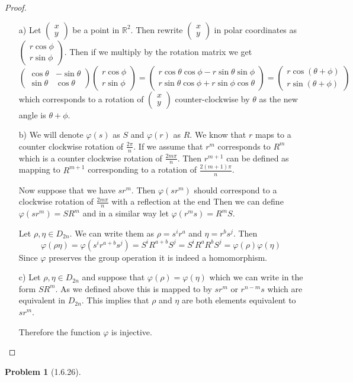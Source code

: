 \documentclass[10pt]{article}
\newcommand{\sk}{\vskip 10mm}
\newcommand{\bb}[1]{\mathbb{#1}}
\newcommand{\vc}[2]{\left(\begin{array}{cc} #1\\ #2\end{array}\right)}
\theoremstyle{plain}
\newtheorem{problem}{Problem}
\theoremstyle{remark}
\begin{document}
\begin{proof}
  \begin{itemize}
  \item[a)] Let $\vc{x}{y}$ be a point in $\bb{R}^2$. Then rewrite $\vc{x}{y}$ in
    polar coordinates as $\vc{r\cos\phi}{r\sin\phi}$. Then if we multiply by the
    rotation matrix we get
    \[
      \left(\begin{array}{cc}
        \cos\theta&-\sin\theta\\
        \sin\theta&\cos\theta
      \end{array}\right)
      \vc{r\cos\phi}{r\sin\phi}
      = \vc{r\cos\theta\cos\phi-r\sin\theta\sin\phi}{r\sin\theta\cos\phi+r\sin\phi\cos\theta}
      = \vc{r\cos(\theta+\phi)}{r\sin(\theta+\phi)}
    \]
    which corresponds to a rotation of $\vc{x}{y}$ counter-clockwise by $\theta$
    as the new angle is $\theta+\phi$.
  \item[b)] We will denote $\varphi(s)$ as $S$ and $\varphi(r)$ as $R$. We know that $r$
    maps to a counter clockwise rotation of $\frac{2\pi}{n}$. If we assume that $r^m$ corresponds
    to $R^m$ which is a counter clockwise rotation of $\frac{2m\pi}{n}$. Then $r^{m+1}$ can
    be defined as mapping to $R^{m+1}$ corresponding to a rotation of
    $\frac{2(m+1)\pi}{n}$.

    Now suppose that we have $sr^m$. Then $\varphi(sr^m)$ should
    correspond to a clockwise rotation of $\frac{2m\pi}{n}$
    with a reflection at the end
    Then we can define $\varphi(sr^m)=SR^m$ and in a similar way
    let $\varphi(r^ms)=R^mS$.

    Let $\rho,\eta\in D_{2n}$. We can write them as
    $\rho= s^ir^a$ and $\eta=r^bs^j$. Then
    \[ \varphi(\rho\eta)=\varphi(s^ir^{a+b}s^j)=S^iR^{a+b}S^j=S^iR^{a}R^bS^j=\varphi(\rho)\varphi(\eta)\]
    Since $\varphi$ preserves the group operation it is indeed a
    homomorphism.
  \item[c)] Let $\rho,\eta\in D_{2n}$ and suppose that
    $\varphi(\rho)=\varphi(\eta)$ which we can write in the form
    $SR^m$. As we defined above this is mapped to by
    $sr^m$ or $r^{n-m}s$ which are equivalent in $D_{2n}$.
    This implies that $\rho$ and $\eta$ are both elements
    equivalent to $sr^m$.

    Therefore the function $\varphi$ is injective.
  \end{itemize}
\end{proof}

\sk

\begin{problem}[1.6.26]
  
\end{problem}
\end{document}

